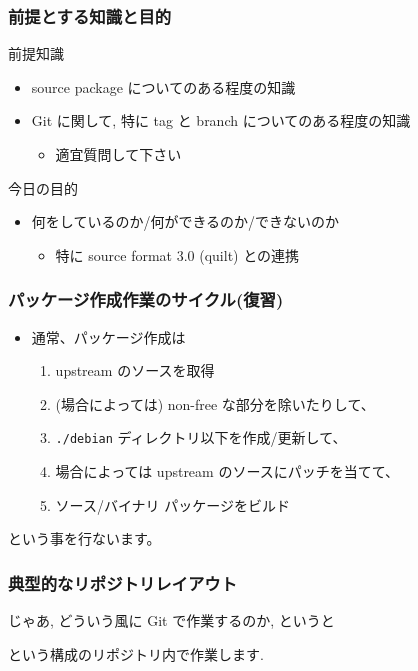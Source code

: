 \documentclass[10pt,final,c,dvipdfmx,cjk,colorlinks=false]{beamer}
\begin{document}
\begin{frame}
\frametitle{前提とする知識と目的}
\label{sec-1-3}
\begin{block}{前提知識}
\label{sec-1-3-1}

\begin{itemize}
\item source package についてのある程度の知識
\item Git に関して, 特に tag と branch についてのある程度の知識
\begin{itemize}
\item 適宜質問して下さい
\end{itemize}
\end{itemize}
\end{block}
\begin{block}{今日の目的}
\label{sec-1-3-2}

\begin{itemize}
\item 何をしているのか/何ができるのか/できないのか
\begin{itemize}
\item 特に source format 3.0 (quilt) との連携
\end{itemize}
\end{itemize}
\end{block}
\end{frame}
\begin{frame}
\frametitle{パッケージ作成作業のサイクル(復習)}
\label{sec-1-4}


\begin{itemize}
\item 通常、パッケージ作成は
\begin{enumerate}
\item upstream のソースを取得
\item (場合によっては) non-free な部分を除いたりして、
\item \texttt{./debian} ディレクトリ以下を作成/更新して、
\item 場合によっては upstream のソースにパッチを当てて、
\item ソース/バイナリ パッケージをビルド
\end{enumerate}
\end{itemize}

という事を行ないます。
\end{frame}
\begin{frame}
\frametitle{典型的なリポジトリレイアウト}
\label{sec-1-5}


じゃあ, どういう風に Git で作業するのか, というと


という構成のリポジトリ内で作業します.
\end{frame}
\end{document}
